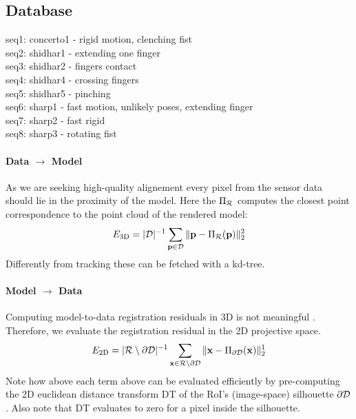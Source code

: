 \clearpage



\subsection{Database}
seq1: concerto1 - rigid motion, clenching fist \\
seq2: shidhar1 - extending one finger \\
seq3: shidhar2 - fingers contact \\
seq4: shidhar4 - crossing fingers \\ 
seq5: shidhar5 - pinching \\
seq6: sharp1 - fast motion, unlikely poses, extending finger \\ 
seq7: sharp2 - fast rigid  \\
seq8: sharp3 - rotating fist







\paragraph{Data $\rightarrow$ Model}
As we are seeking high-quality alignement every pixel from the sensor data should lie in the proximity of the model. Here the $\Pi_{\mathcal{R}}$ computes the closest point correspondence to the point cloud of the rendered model:
% 
\begin{equation}
E_\text{3D} = |\mathcal{D}|^{-1} \sum_{\mathbf{p} \in \mathcal{D}} \| \mathbf{p} - \Pi_{\mathcal{R}}(\mathbf{p}) \|_2^2
\label{eq:metric1}
\end{equation}
% 
Differently from tracking these can be fetched with a kd-tree.

\paragraph{Model $\rightarrow$ Data}
Computing model-to-data registration residuals in 3D is not meaningful . Therefore, we evaluate the registration residual in the 2D projective space. 
\begin{eqnarray}
E_\text{2D} = |\mathcal{R} \setminus \partial\mathcal{D}|^{-1} 
\sum_{\mathbf{x} \in \mathcal{R} \setminus \partial\mathcal{D}} \| \mathbf{x} - \Pi_{\partial\mathcal{D}}(\mathbf{x}) \|^1_2
\label{eq:metric2}
\end{eqnarray}
Note how above each term above can be evaluated efficiently by pre-computing the 2D euclidean distance transform DT of the RoI's (image-space) silhouette $\partial \mathcal{D}$. Also note that DT evaluates to zero for a pixel inside the silhouette. 

